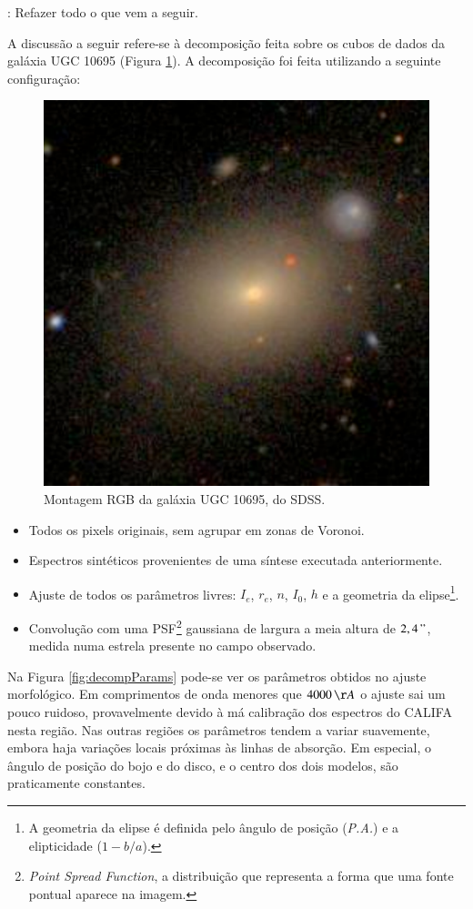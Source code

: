 \TODO: Refazer todo o que vem a seguir.

A discussão a seguir refere-se à decomposição feita sobre os cubos de dados da
galáxia UGC 10695 (Figura \ref{fig:decompTarget}). A decomposição foi feita
utilizando a seguinte configuração:

\begin{figure}
	\includegraphics[width=0.3\columnwidth]{figuras/K0846}
	\caption[Montagem RGB da galáxia UGC 10695, do SDSS] {Montagem RGB da galáxia 
	UGC 10695, do SDSS.}
	\label{fig:decompTarget}
\end{figure}

\begin{itemize}

	\item Todos os pixels originais, sem agrupar em zonas de Voronoi.

	\item Espectros sintéticos provenientes de uma síntese executada anteriormente.

	\item Ajuste de todos os parâmetros livres: $I_e$, $r_e$, $n$, $I_0$, $h$ e a
	geometria da elipse\footnote{A geometria da elipse é definida pelo ângulo de
	posição ({\em P.A.}) e a elipticidade ($1 - b/a$).}.

	\item Convolução com uma PSF\footnote{{\em Point Spread Function}, a
	distribuição que representa a forma que uma fonte pontual aparece na imagem.}
	gaussiana de largura a meia altura de $2,4\,"$, medida numa estrela presente no
	campo observado.

\end{itemize}

Na Figura \ref{fig:decompParams} pode-se ver os parâmetros obtidos no ajuste
morfológico. Em comprimentos de onda menores que $4000\,\AA$ o ajuste sai um
pouco ruidoso, provavelmente devido à má calibração dos espectros do CALIFA
nesta região. Nas outras regiões os parâmetros tendem a variar suavemente,
embora haja variações locais próximas às linhas de absorção. Em especial, o
ângulo de posição do bojo e do disco, e o centro dos dois modelos, são
praticamente constantes.

